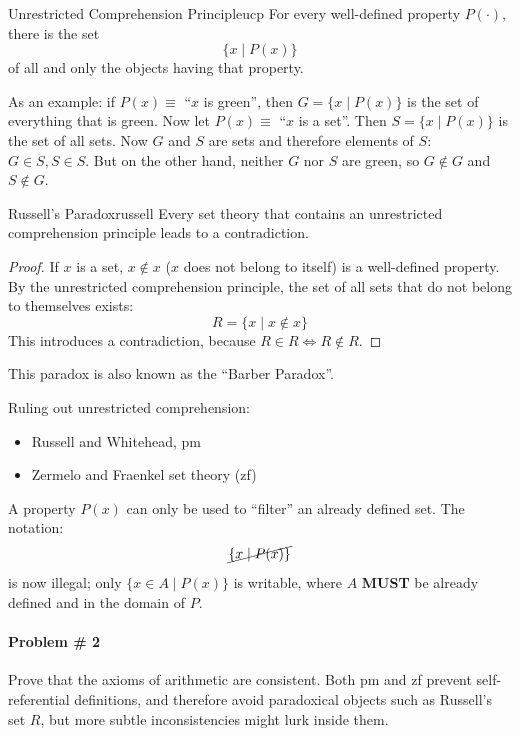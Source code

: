 \begin{definition}{Unrestricted Comprehension Principle}{ucp}
    For every well-defined property \(P(\cdot)\), there is the set
    \[
        \{x\mid P(x)\}
    \]
    of all and only the objects having that property.
\end{definition}

As an example: if \(P(x)\equiv\) ``\(x\) is green'', then \(G=\{x\mid P(x)\}\) is the set of everything that is green. Now let \(P(x)\equiv\) ``\(x\) is a set''. Then \(S = \{x\mid P(x)\}\) is the set of all sets. Now \(G\) and \(S\) are sets and therefore elements of \(S\): \(G\in S, S\in S\). But on the other hand, neither \(G\) nor \(S\) are green, so \(G\notin G\) and \(S\notin G\).

\begin{theorem}{Russell's Paradox}{russell}
    Every set theory that contains an unrestricted comprehension principle leads to a contradiction.
\end{theorem}
\begin{proof}
    If \(x\) is a set, \(x\notin x\) (\(x\) does not belong to itself) is a well-defined property. By the unrestricted comprehension principle, the set of all sets that do not belong to themselves exists:
    \[
        R=\{x\mid x\notin x\}
    \]
    This introduces a contradiction, because \(R\in R \iff R\notin R\).
\end{proof}
This paradox is also known as the ``Barber Paradox''.

\noindent Ruling out unrestricted comprehension:
\begin{itemize}
    \item Russell and Whitehead, \gls{pm}
    \item Zermelo and Fraenkel set theory (\gls{zf})
\end{itemize}
A property \(P(x)\) can only be used to ``filter'' an already defined set. The notation:
\[
    \cancel{\{x\mid P(x)\}}
\] 
is now illegal; only \(\{x\in A\mid P(x)\}\) is writable, where \(A\) \textbf{MUST} be already defined and in the domain of \(P\).

\paragraph{Problem \# 2} Prove that the axioms of arithmetic are consistent. Both \gls{pm} and \gls{zf} prevent self-referential definitions, and therefore avoid paradoxical objects such as Russell's set \(R\), but more subtle inconsistencies might lurk inside them.

